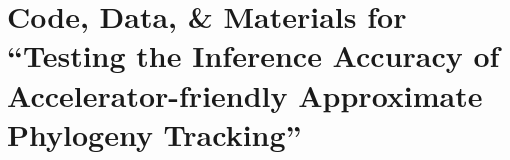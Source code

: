 \section*{Code, Data, \& Materials for ``Testing the Inference Accuracy of Accelerator-friendly Approximate Phylogeny Tracking''}

\setcounter{section}{0}
\setcounter{equation}{0}
\setcounter{figure}{0}
\setcounter{table}{0}

\makeatletter
\def\@seccntformat#1{\@ifundefined{#1@cntformat}%
   {\csname the#1\endcsname\space}%
   {\csname #1@cntformat\endcsname}}%
\newcommand\section@cntformat{\thesection\space} %
\makeatother
\renewcommand{\thesection}{A}







% 

% 
% 
% 
